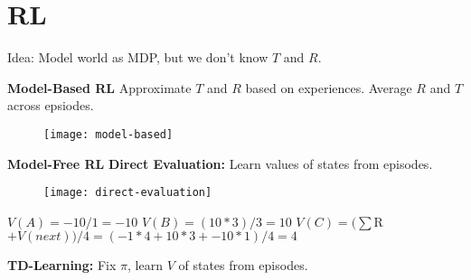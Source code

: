 \section{RL}
Idea: Model world as MDP, but we don't know $T$ and $R$.

\textbf{Model-Based RL}
Approximate $T$ and $R$ based on experiences. Average $R$ and $T$ across epsiodes.
\begin{figure}[H]
    \centering
    \texttt{[image: model-based]}
\end{figure}
\textbf{Model-Free RL}
\textbf{Direct Evaluation:} Learn values of states from episodes.
\begin{figure}[H]
    \centering
    \texttt{[image: direct-evaluation]}
\end{figure}
$V(A) = -10 / 1 = -10$
$V(B) = (10 * 3) / 3 = 10$
$V(C) = (\sum $R$ + V(next)) / 4 = (-1 * 4 + 10 * 3 + -10 * 1) / 4 = 4$

\textbf{TD-Learning:} Fix $\pi$, learn $V$ of states from episodes.
